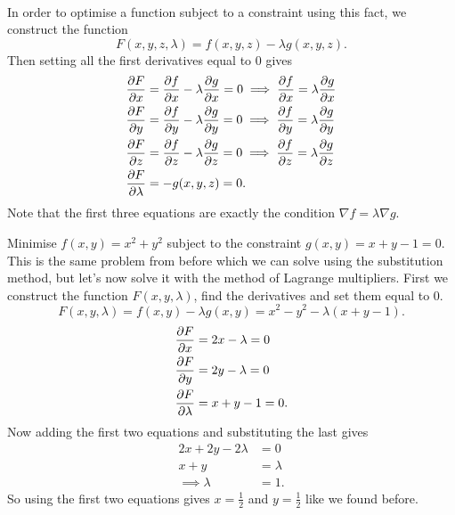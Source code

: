 \documentclass[../multivariate_calculus.tex]{subfiles}
\begin{document}
        \paragraph{}
        In order to optimise a function subject to a constraint using this fact, we construct the function
        \begin{equation}
            F(x,y,z,\lambda)=f(x,y,z)-\lambda g(x,y,z).
        \end{equation} 
        Then setting all the first derivatives equal to 0 gives
        \begin{align}
            \frac{\partial F}{\partial x}&=\frac{\partial f}{\partial x}-\lambda\frac{\partial g}{\partial x}=0\implies\frac{\partial f}{\partial x}=\lambda\frac{\partial g}{\partial x}\\
            \frac{\partial F}{\partial y}&=\frac{\partial f}{\partial y}-\lambda\frac{\partial g}{\partial y}=0\implies\frac{\partial f}{\partial y}=\lambda\frac{\partial g}{\partial y}\\
            \frac{\partial F}{\partial z}&=\frac{\partial f}{\partial z}-\lambda\frac{\partial g}{\partial z}=0\implies\frac{\partial f}{\partial z}=\lambda\frac{\partial g}{\partial z}\\
            \frac{\partial F}{\partial\lambda}&=-g(x,y,z)=0.
        \end{align}
        Note that the first three equations are exactly the condition $\nabla f=\lambda\nabla g$.
        \begin{example}
            Minimise $f(x,y)=x^2+y^2$ subject to the constraint $g(x,y)=x+y-1=0$.
            This is the same problem from before which we can solve using the substitution method, but let's now solve it with the method of Lagrange multipliers.
            First we construct the function $F(x,y,\lambda)$, find the derivatives and set them equal to 0.
            \begin{equation}
                F(x,y,\lambda)=f(x,y)-\lambda g(x,y)=x^2-y^2-\lambda(x+y-1).
            \end{equation}
            \begin{align}
                \frac{\partial F}{\partial x}&=2x-\lambda=0\\
                \frac{\partial F}{\partial y}&=2y-\lambda=0\\
                \frac{\partial F}{\partial\lambda}&=x+y-1=0.
            \end{align}
            Now adding the first two equations and substituting the last gives
            \begin{align}
                2x+2y-2\lambda&=0\\
                x+y&=\lambda\\
                \implies\lambda&=1.
            \end{align}
            So using the first two equations gives $x=\frac{1}{2}$ and $y=\frac{1}{2}$ like we found before.
        \end{example}
\end{document}
